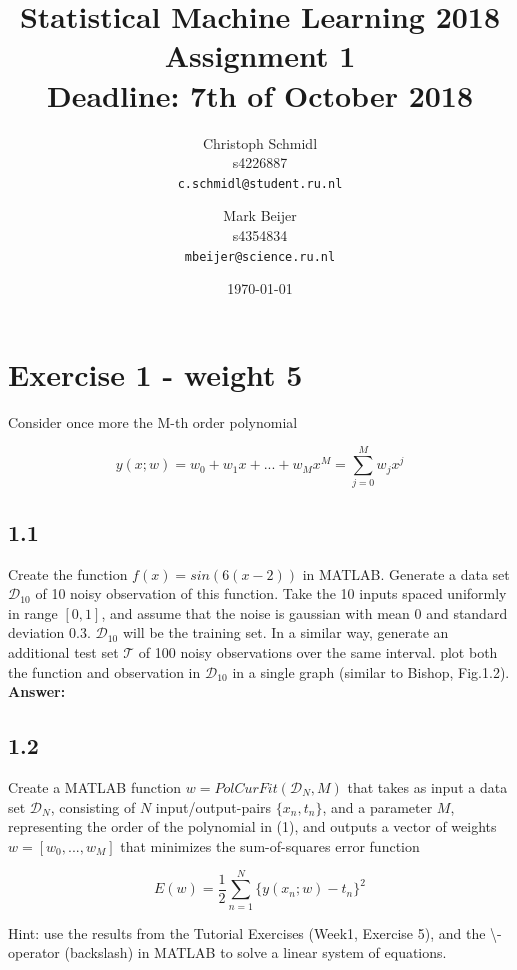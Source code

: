 \documentclass[a4paper]{article}
\title{Statistical Machine Learning 2018\\Assignment 1\\Deadline: 7th of October 2018}
\author{
  Christoph Schmidl\\ s4226887\\      \texttt{c.schmidl@student.ru.nl}
  \and
  Mark Beijer\\ s4354834\\     \texttt{mbeijer@science.ru.nl}
}
\date{\today}
\begin{document}
\maketitle


\section*{Exercise 1 - weight 5}

Consider once more the M-th order polynomial

\begin{equation}
	y(x;w) = w_0 + w_1x + ... + w_Mx^M = \sum_{j = 0}^M w_jx^j
\end{equation}

\subsection*{1.1}

Create the function $f(x) = sin(6(x-2))$ in MATLAB. Generate a data set $\mathcal{D}_{10}$ of 10 noisy observation of this function. Take the 10 inputs spaced uniformly in range $[0,1]$, and assume that the noise is gaussian with mean 0 and standard deviation 0.3. $\mathcal{D}_{10}$ will be the training set. In a similar way, generate an additional test set $\mathcal{T}$ of 100 noisy observations over the same interval. plot both the function and observation in $\mathcal{D}_{10}$ in a single graph (similar to Bishop, Fig.1.2).\\

\textbf{Answer:}\\

\subsection*{1.2}

Create a MATLAB function $w = PolCurFit(\mathcal{D}_N,M)$ that takes as input a data set $\mathcal{D}_N$, consisting of $N$ input/output-pairs $\{ x_n, t_n\}$, and a parameter $M$, representing the order of the polynomial in (1), and outputs a vector of weights $w = [w_0, ...,w_M]$ that minimizes the sum-of-squares error function

\begin{equation}
	E(w) = \frac{1}{2} \sum_{n=1}^N \{ y(x_n;w) - t_n\}^2
\end{equation}

Hint: use the results from the Tutorial Exercises (Week1, Exercise 5), and the \textbackslash-operator (backslash) in MATLAB to solve a linear system of equations.\\
\end{document}
